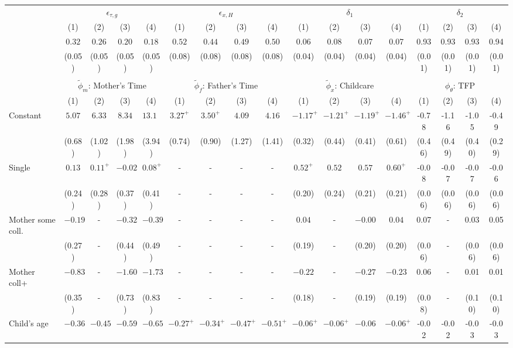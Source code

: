 \begin{tabular}{lcccccccccccccccc}\\\toprule
 & \multicolumn{4}{c}{$\epsilon_{\tau,g}$} & \multicolumn{4}{c}{$\epsilon_{x,H}$} & \multicolumn{4}{c}{$\delta_{1}$} & \multicolumn{4}{c}{$\delta_{2}$} \\
&(1)&(2)&(3)&(4)&(1)&(2)&(3)&(4)&(1)&(2)&(3)&(4)&(1)&(2)&(3)&(4)\\\cmidrule(r){2-5}\cmidrule(r){6-9}\cmidrule(r){10-13}\cmidrule(r){14-17}
&$0.32$&$0.26$&$0.20$&$0.18$&$0.52$&$0.44$&$0.49$&$0.50$&0.06&0.08&0.07&0.07&0.93&0.93&0.93&0.94\\
&(0.05)&(0.05)&(0.05)&(0.05)&(0.08)&(0.08)&(0.08)&(0.08)&(0.04)&(0.04)&(0.04)&(0.04)&(0.01)&(0.01)&(0.01)&(0.01)\\
&&&&&&&&&&&&&&&&\\
 & \multicolumn{4}{c}{$\tilde{\phi}_{m}$: Mother's Time} & \multicolumn{4}{c}{$\tilde{\phi}_{f}$: Father's Time} & \multicolumn{4}{c}{$\tilde{\phi}_{x}$: Childcare} & \multicolumn{4}{c}{$\phi_{\theta}$: TFP} \\
&(1)&(2)&(3)&(4)&(1)&(2)&(3)&(4)&(1)&(2)&(3)&(4)&(1)&(2)&(3)&(4)\\\cmidrule(r){2-5}\cmidrule(r){6-9}\cmidrule(r){10-13}\cmidrule(r){14-17}
Constant&$5.07$&$6.33$&$8.34$&$13.12$&$3.27^{+}$&$3.50^{+}$&$4.09$&$4.16$&$-1.17^{+}$&$-1.21^{+}$&$-1.19^{+}$&$-1.46^{+}$&-0.78&-1.16&-1.05&-0.49\\
&(0.68)&(1.02)&(1.98)&(3.94)&(0.74)&(0.90)&(1.27)&(1.41)&(0.32)&(0.44)&(0.41)&(0.61)&(0.46)&(0.49)&(0.40)&(0.29)\\
Single&$0.13$&$0.11^{+}$&$-0.02$&$0.08^{+}$&-&-&-&-&$0.52^{+}$&$0.52$&$0.57$&$0.60^{+}$&-0.08&-0.07&-0.07&-0.06\\
&(0.24)&(0.28)&(0.37)&(0.41)&-&-&-&-&(0.20)&(0.24)&(0.21)&(0.21)&(0.06)&(0.06)&(0.06)&(0.06)\\
Mother some coll.&$-0.19$&-&$-0.32$&$-0.39$&-&-&-&-&$0.04$&-&$-0.00$&$0.04$&0.07&-&0.03&0.05\\
&(0.27)&-&(0.44)&(0.49)&-&-&-&-&(0.19)&-&(0.20)&(0.20)&(0.06)&-&(0.06)&(0.06)\\
Mother coll+&$-0.83$&-&$-1.60$&$-1.73$&-&-&-&-&$-0.22$&-&$-0.27$&$-0.23$&0.06&-&0.01&0.01\\
&(0.35)&-&(0.73)&(0.83)&-&-&-&-&(0.18)&-&(0.19)&(0.19)&(0.08)&-&(0.10)&(0.10)\\
Child's age&$-0.36$&$-0.45$&$-0.59$&$-0.65$&$-0.27^{+}$&$-0.34^{+}$&$-0.47^{+}$&$-0.51^{+}$&$-0.06^{+}$&$-0.06^{+}$&$-0.06$&$-0.06^{+}$&-0.02&-0.02&-0.03&-0.03\\

\end{tabular}
